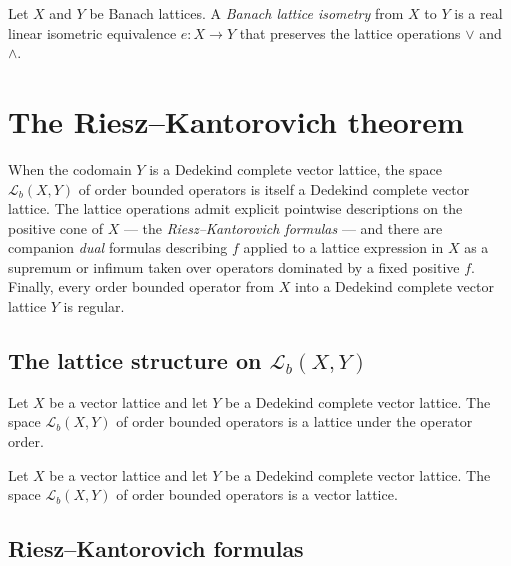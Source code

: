 \begin{definition}
\label{def:banachLatEquiv}
\leanok
{}
Let $X$ and $Y$ be Banach lattices. A \emph{Banach lattice
isometry} from $X$ to $Y$ is a real linear isometric equivalence
$e \colon X \to Y$ that preserves the lattice operations $\vee$
and $\wedge$.
\end{definition}

\section{The Riesz--Kantorovich theorem}

When the codomain $Y$ is a Dedekind complete vector lattice, the
space $\mathcal{L}_b(X, Y)$ of order bounded operators is itself a
Dedekind complete vector lattice. The lattice operations admit
explicit pointwise descriptions on the positive cone of $X$ — the
\emph{Riesz--Kantorovich formulas} — and there are companion
\emph{dual} formulas describing $f$ applied to a lattice expression
in $X$ as a supremum or infimum taken over operators dominated by a
fixed positive $f$. Finally, every order bounded operator from $X$
into a Dedekind complete vector lattice $Y$ is regular.

\subsection{The lattice structure on $\mathcal{L}_b(X, Y)$}

\begin{theorem}
\label{thm:orderBoundedHom-instLattice}
\leanok
{}
Let $X$ be a vector lattice and let $Y$ be a Dedekind complete
vector lattice. The space $\mathcal{L}_b(X, Y)$ of order bounded
operators is a lattice under the operator order.
\end{theorem}

\begin{theorem}
\label{thm:orderBoundedHom-instVectorLattice}
\leanok
{}
Let $X$ be a vector lattice and let $Y$ be a Dedekind complete
vector lattice. The space $\mathcal{L}_b(X, Y)$ of order bounded
operators is a vector lattice.
\end{theorem}

\subsection{Riesz--Kantorovich formulas}

